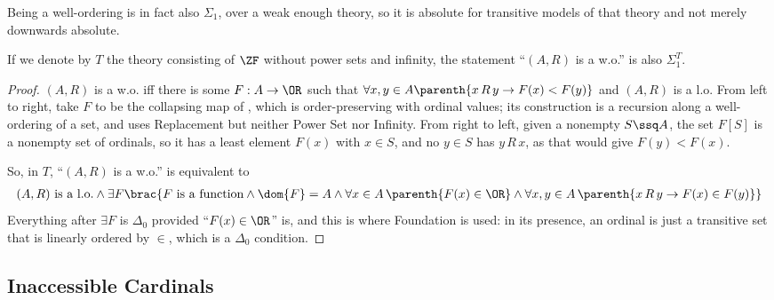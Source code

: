 Being a well-ordering is in fact also $\Sigma_1$, over a weak enough theory, so it is absolute for transitive models of that theory and not merely downwards absolute.

\begin{boxlemma}
    If we denote by $T$ the theory consisting of $\ZF$ without power sets and infinity, the statement ``$(A, R)$ is a w.o.'' is also $\Sigma_1^T$.
\end{boxlemma}
\begin{proof}
    $(A, R)$ is a w.o. iff there is some $F : A \to \OR$ such that $\forall x, y \in A \parenth{x \, R \, y \to F(x) < F(y)}$ %
    and $(A, R)$ is a l.o. From left to right, take $F$ to be the collapsing map of , which is order-preserving with ordinal values; its construction is a recursion along a well-ordering of a set, and uses Replacement but neither Power Set nor Infinity. From right to left, given a nonempty $S \ssq A$, the set $F[S]$ is a nonempty set of ordinals, so it has a least element $F(x)$ with $x \in S$, and no $y \in S$ has $y \, R \, x$, as that would give $F(y) < F(x)$.

    So, in $T$, ``$(A, R)$ is a w.o.'' is equivalent to
    \begin{align*}
        \text{$(A, R)$ is a l.o.} \land \exists F \brac{F \text{ is a function} \land \dom{F} = A \land \forall x \in A \, \parenth{F(x) \in \OR} \land \forall x, y \in A \, \parenth{x \, R \, y \to F(x) \in F(y)}}
    \end{align*}
    Everything after $\exists F$ is $\Delta_0$ provided ``$F(x) \in \OR$'' is, and this is where Foundation is used: in its presence, an ordinal is just a transitive set that is linearly ordered by $\in$, which is a $\Delta_0$ condition.
\end{proof}

\subsection{Inaccessible Cardinals}

